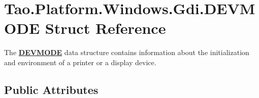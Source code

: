\hypertarget{struct_tao_1_1_platform_1_1_windows_1_1_gdi_1_1_d_e_v_m_o_d_e}{
\section{Tao.Platform.Windows.Gdi.DEVMODE Struct Reference}
\label{struct_tao_1_1_platform_1_1_windows_1_1_gdi_1_1_d_e_v_m_o_d_e}
}


The {\bfseries \hyperlink{struct_tao_1_1_platform_1_1_windows_1_1_gdi_1_1_d_e_v_m_o_d_e}{DEVMODE}} data structure contains information about the initialization and environment of a printer or a display device.  


\subsection*{Public Attributes}
